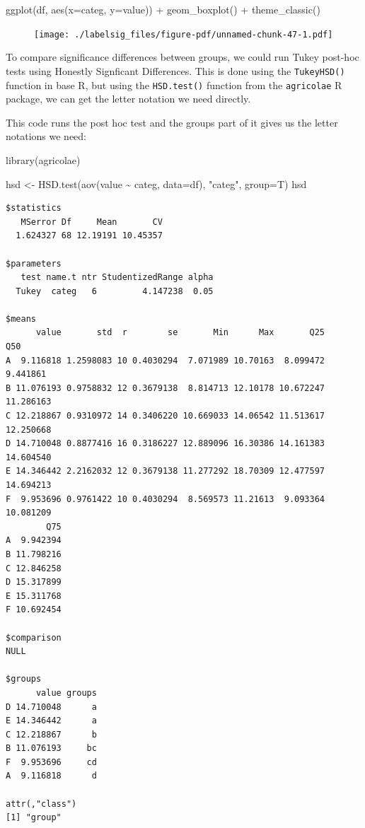 \documentclass[
  letterpaper,
  DIV=11,
  numbers=noendperiod]{scrreprt}
\newenvironment{Shaded}{\begin{snugshade}}{\end{snugshade}}
\newcommand{\AttributeTok}[1]{\textcolor[rgb]{0.40,0.45,0.13}{#1}}
\newcommand{\FunctionTok}[1]{\textcolor[rgb]{0.28,0.35,0.67}{#1}}
\newcommand{\NormalTok}[1]{\textcolor[rgb]{0.00,0.23,0.31}{#1}}
\newcommand{\OtherTok}[1]{\textcolor[rgb]{0.00,0.23,0.31}{#1}}
\newcommand{\SpecialCharTok}[1]{\textcolor[rgb]{0.37,0.37,0.37}{#1}}
\newcommand{\StringTok}[1]{\textcolor[rgb]{0.13,0.47,0.30}{#1}}
\begin{document}
\begin{Shaded}
\begin{Highlighting}[]
\FunctionTok{ggplot}\NormalTok{(df, }\FunctionTok{aes}\NormalTok{(}\AttributeTok{x=}\NormalTok{categ, }\AttributeTok{y=}\NormalTok{value)) }\SpecialCharTok{+}
  \FunctionTok{geom\_boxplot}\NormalTok{() }\SpecialCharTok{+}
  \FunctionTok{theme\_classic}\NormalTok{()}
\end{Highlighting}
\end{Shaded}

\begin{figure}[H]

{\centering \texttt{[image: ./labelsig\_files/figure-pdf/unnamed-chunk-47-1.pdf]}

}

\end{figure}

To compare significance differences between groups, we could run Tukey
post-hoc tests using Honestly Signficant Differences. This is done using
the \texttt{TukeyHSD()} function in base R, but using the
\texttt{HSD.test()} function from the \texttt{agricolae} R package, we
can get the letter notation we need directly.

This code runs the post hoc test and the groups part of it gives us the
letter notations we need:

\begin{Shaded}
\begin{Highlighting}[]
\FunctionTok{library}\NormalTok{(agricolae)}

\NormalTok{hsd }\OtherTok{\textless{}{-}} \FunctionTok{HSD.test}\NormalTok{(}\FunctionTok{aov}\NormalTok{(value }\SpecialCharTok{\textasciitilde{}}\NormalTok{ categ, }\AttributeTok{data=}\NormalTok{df), }\StringTok{"categ"}\NormalTok{, }\AttributeTok{group=}\NormalTok{T)}
\NormalTok{hsd}
\end{Highlighting}
\end{Shaded}

\begin{verbatim}
$statistics
   MSerror Df     Mean       CV
  1.624327 68 12.19191 10.45357

$parameters
   test name.t ntr StudentizedRange alpha
  Tukey  categ   6         4.147238  0.05

$means
      value       std  r        se       Min      Max       Q25       Q50
A  9.116818 1.2598083 10 0.4030294  7.071989 10.70163  8.099472  9.441861
B 11.076193 0.9758832 12 0.3679138  8.814713 12.10178 10.672247 11.286163
C 12.218867 0.9310972 14 0.3406220 10.669033 14.06542 11.513617 12.250668
D 14.710048 0.8877416 16 0.3186227 12.889096 16.30386 14.161383 14.604540
E 14.346442 2.2162032 12 0.3679138 11.277292 18.70309 12.477597 14.694213
F  9.953696 0.9761422 10 0.4030294  8.569573 11.21613  9.093364 10.081209
        Q75
A  9.942394
B 11.798216
C 12.846258
D 15.317899
E 15.311768
F 10.692454

$comparison
NULL

$groups
      value groups
D 14.710048      a
E 14.346442      a
C 12.218867      b
B 11.076193     bc
F  9.953696     cd
A  9.116818      d

attr(,"class")
[1] "group"
\end{verbatim}
\end{document}
